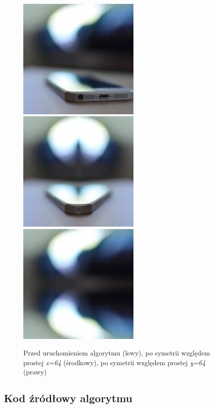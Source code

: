 \documentclass[a4paper,12pt]{book}
\begin{document}
\begin{figure}[H]
	\caption{Przed uruchomieniem algorytmu (lewy), po symetrii względem prostej \textit{x=64} (środkowy), po symetrii względem prostej \textit{y=64} (prawy)}
	\includegraphics[width=6cm, height=6cm]{phone-unmodified.jpg}
	\includegraphics[width=6cm, height=6cm]{4-4/x-symmetry-phone-64.png}
	\includegraphics[width=6cm, height=6cm]{4-4/y-symmetry-phone-64.png}
\end{figure}

\subsection*{Kod źródłowy algorytmu}
\end{document}

